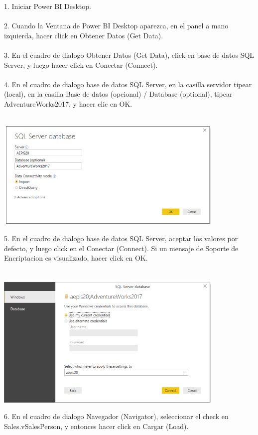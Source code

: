 \documentclass[12pt,letterpaper]{article}
\begin{document}
1. Iniciar Power BI Desktop.\\\\ 
2. Cuando la Ventana de Power BI Desktop aparezca, en el panel a mano izquierda, hacer click en Obtener Datos (Get Data).\\\\ 
3. En el cuadro de dialogo Obtener Datos (Get Data), click en base de datos SQL Server, y luego hacer click en Conectar (Connect).\\\\ 
4. En el cuadro de dialogo base de datos SQL Server, en la casilla servidor tipear (local), en la casilla Base de datos (opcional) / Database (optional), tipear AdventureWorks2017, y hacer clic en OK.\\\\ 
\begin{center}
\includegraphics[width=11cm]{IMG/1.png} 
\end{center}
5. En el cuadro de dialogo base de datos SQL Server, aceptar los valores por defecto, y luego click en el Conectar (Connect). Si un mensaje de Soporte de Encriptacion es visualizado, hacer click en OK.\\\\ 
\begin{center}
\includegraphics[width=11cm]{IMG/2.png} 
\end{center}
6. En el cuadro de dialogo Navegador (Navigator), seleccionar el check en Sales.vSalesPerson, y entonces hacer click en Cargar (Load).\\\\ 
\end{document}
